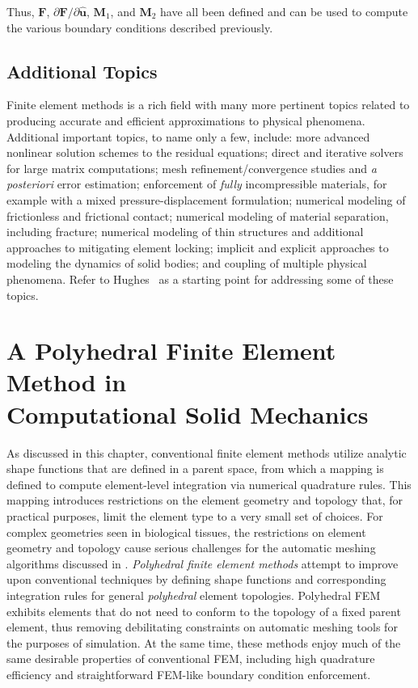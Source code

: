 Thus, $\bm{F}$, ${\partial \bm{F}}/{\partial \hat{\bm{u}}}$, $\bm{M}_1$, and $\bm{M}_2$ have all been defined and can be used to compute the various boundary conditions described previously.

\subsection{Additional Topics}
Finite element methods is a rich field with many more pertinent topics related to producing accurate and efficient approximations to physical phenomena. Additional important topics, to name only a few, include: more advanced nonlinear solution schemes to the residual equations; direct and iterative solvers for large matrix computations; mesh refinement/convergence studies and \textit{a posteriori} error estimation; 
enforcement of \textit{fully} incompressible materials, for example with a mixed pressure-displacement formulation; numerical modeling of frictionless and frictional contact; numerical modeling of material separation, including fracture; numerical modeling of thin structures and additional approaches to mitigating element locking; implicit and explicit approaches to modeling the dynamics of solid bodies; and coupling of multiple physical phenomena. Refer to Hughes~\cite{hughes_2000} as a starting point for addressing some of these topics.

\section[A Polyhedral Finite Element Method in Computational Solid \\ Mechanics]{\texorpdfstring{A Polyhedral Finite Element Method in \\ Computational Solid Mechanics}{A Polyhedral Finite Element Method in Computational Solid \\ Mechanics}}
\label{A Polyhedral Finite Element Method in Computational Solid Mechanics}

As discussed in this chapter, conventional finite element methods utilize analytic shape functions that are defined in a parent space, from which a mapping is defined to compute element-level integration via numerical quadrature rules. This mapping introduces restrictions on the element geometry and topology that, for practical purposes, limit the element type to a very small set of choices. For complex geometries seen in biological tissues, the restrictions on element geometry and topology cause serious challenges for the automatic meshing algorithms discussed in . \textit{Polyhedral finite element methods} attempt to improve upon conventional techniques by defining shape functions and corresponding integration rules for general  \textit{polyhedral} element topologies. Polyhedral FEM exhibits elements that do not need to conform to the topology of a fixed parent element, thus removing debilitating constraints on automatic meshing tools for the purposes of simulation. At the same time, these methods enjoy much of the same desirable properties of conventional FEM, including high quadrature efficiency and straightforward FEM-like boundary condition enforcement.


